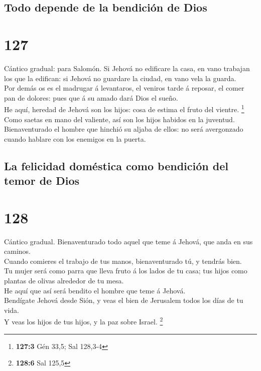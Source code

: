 \hypertarget{todo-depende-de-la-bendiciuxf3n-de-dios}{%
\subsection{Todo depende de la bendición de
Dios}\label{todo-depende-de-la-bendiciuxf3n-de-dios}}

\hypertarget{section-126}{%
\section{127}\label{section-126}}

 Cántico gradual: para Salomón. Si Jehová no edificare la
casa, en vano trabajan los que la edifican: si Jehová no guardare la
ciudad, en vano vela la guarda.\\
 Por demás os es el madrugar á levantaros, el veniros tarde
á reposar, el comer pan de dolores: pues que á su amado dará Dios el
sueño.\\
 He aquí, heredad de Jehová son los hijos: cosa de estima el
fruto del vientre. \footnote{\textbf{127:3} Gén 33,5; Sal 128,3-4}\\
 Como saetas en mano del valiente, así son los hijos habidos
en la juventud.\\
 Bienaventurado el hombre que hinchió su aljaba de ellos: no
será avergonzado cuando hablare con los enemigos en la puerta.

\hypertarget{la-felicidad-domuxe9stica-como-bendiciuxf3n-del-temor-de-dios}{%
\subsection{La felicidad doméstica como bendición del temor de
Dios}\label{la-felicidad-domuxe9stica-como-bendiciuxf3n-del-temor-de-dios}}

\hypertarget{section-127}{%
\section{128}\label{section-127}}

 Cántico gradual. Bienaventurado todo aquel que teme á
Jehová, que anda en sus caminos.\\
 Cuando comieres el trabajo de tus manos, bienaventurado tú,
y tendrás bien.\\
 Tu mujer será como parra que lleva fruto á los lados de tu
casa; tus hijos como plantas de olivas alrededor de tu mesa.\\
 He aquí que así será bendito el hombre que teme á Jehová.\\
 Bendígate Jehová desde Sión, y veas el bien de Jerusalem
todos los días de tu vida.\\
 Y veas los hijos de tus hijos, y la paz sobre Israel.
\footnote{\textbf{128:6} Sal 125,5}

